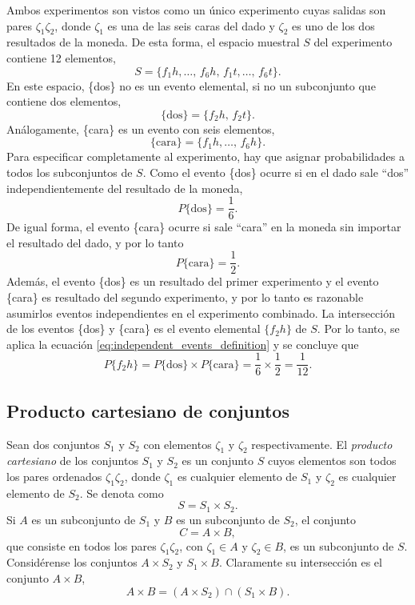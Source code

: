 \documentclass[a4paper]{report}
\begin{document}
Ambos experimentos son vistos como un único experimento cuyas salidas son pares \(\zeta_1\zeta_2\), donde \(\zeta_1\) es una de las seis caras del dado y \(\zeta_2\) es uno de los dos resultados de la moneda. De esta forma, el espacio muestral \(S\) del experimento contiene 12 elementos,
\[
 S=\{f_1h,\dots,\,f_6h,\,f_1t,\dots,\,f_6t\}.
\]
En este espacio, \{dos\} no es un evento elemental, si no un subconjunto que contiene dos elementos,
\[
 \{\textrm{dos}\}=\{f_2h,\,f_2t\}.
\]
Análogamente, \{cara\} es un evento con seis elementos,
\[
 \{\textrm{cara}\}=\{f_1h,\dots,\,f_6h\}.
\]
Para especificar completamente al experimento, hay que asignar probabilidades a todos los subconjuntos de \(S\). Como el evento \{dos\} ocurre si en el dado sale ``dos'' independientemente del resultado de la moneda,
\[
 P\{\textrm{dos}\}=\frac{1}{6}.
\]
De igual forma, el evento \{cara\} ocurre si sale ``cara'' en la moneda sin importar el resultado del dado, y por lo tanto
\[
 P\{\textrm{cara}\}=\frac{1}{2}.
\]
Además, el evento \{dos\} es un resultado del primer experimento y el evento \{cara\} es resultado del segundo experimento, y por lo tanto es razonable asumirlos eventos independientes en el experimento combinado. La intersección de los eventos \{dos\} y \{cara\} es el evento elemental \(\{f_2h\}\) de \(S\). 
Por lo tanto, se aplica la ecuación \ref{eq:independent_events_definition} y se concluye que
\[
 P\{f_2h\}=P\{\textrm{dos}\}\times P\{\textrm{cara}\}=\frac{1}{6}\times\frac{1}{2}=\frac{1}{12}.
\]

\subsection{Producto cartesiano de conjuntos} 

Sean dos conjuntos \(S_1\) y \(S_2\) con elementos \(\zeta_1\) y \(\zeta_2\) respectivamente. El \emph{producto cartesiano} de los conjuntos \(S_1\) y \(S_2\) es un conjunto \(S\) cuyos elementos son todos los pares ordenados \(\zeta_1\zeta_2\), donde \(\zeta_1\) es cualquier elemento de \(S_1\) y  \(\zeta_2\) es cualquier elemento de \(S_2\). Se denota como
\[
 S=S_1\times S_2.
\]
Si \(A\) es un subconjunto de \(S_1\) y \(B\) es un subconjunto de \(S_2\), el conjunto
\[
 C=A\times B,
\]
que consiste en todos los pares \(\zeta_1\zeta_2\), con  \(\zeta_1\in A\) y \(\zeta_2\in B\), es un subconjunto de \(S\). Considérense los conjuntos \(A\times S_2\) y \(S_1\times B\). Claramente su intersección es el conjunto \(A\times B\),
\begin{equation}\label{eq:set_intersection_AB}
 A\times B=(A\times S_2)\cap(S_1\times B).
\end{equation}
\end{document}
